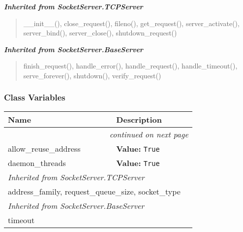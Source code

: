\large{\textbf{\textit{Inherited from SocketServer.TCPServer}}}

\begin{quote}
\_\_init\_\_(), close\_request(), fileno(), get\_request(), server\_activate(), server\_bind(), server\_close(), shutdown\_request()
\end{quote}

\large{\textbf{\textit{Inherited from SocketServer.BaseServer}}}

\begin{quote}
finish\_request(), handle\_error(), handle\_request(), handle\_timeout(), serve\_forever(), shutdown(), verify\_request()
\end{quote}


  \subsubsection{Class Variables}

    \vspace{-1cm}
\hspace{\varindent}\begin{longtable}{|p{\varnamewidth}|p{\vardescrwidth}|l}
\cline{1-2}
\cline{1-2} \centering \textbf{Name} & \centering \textbf{Description}& \\
\cline{1-2}
\endhead\cline{1-2}\multicolumn{3}{r}{\small\textit{continued on next page}}\\\endfoot\cline{1-2}
\endlastfoot\raggedright a\-l\-l\-o\-w\-\_\-r\-e\-u\-s\-e\-\_\-a\-d\-d\-r\-e\-s\-s\- & \raggedright \textbf{Value:} 
{\tt True}&\\
\cline{1-2}
\raggedright d\-a\-e\-m\-o\-n\-\_\-t\-h\-r\-e\-a\-d\-s\- & \raggedright \textbf{Value:} 
{\tt True}&\\
\cline{1-2}
\multicolumn{2}{|l|}{\textit{Inherited from SocketServer.TCPServer}}\\
\multicolumn{2}{|p{\varwidth}|}{\raggedright address\_family, request\_queue\_size, socket\_type}\\
\cline{1-2}
\multicolumn{2}{|l|}{\textit{Inherited from SocketServer.BaseServer}}\\
\multicolumn{2}{|p{\varwidth}|}{\raggedright timeout}\\
\cline{1-2}
\end{longtable}

